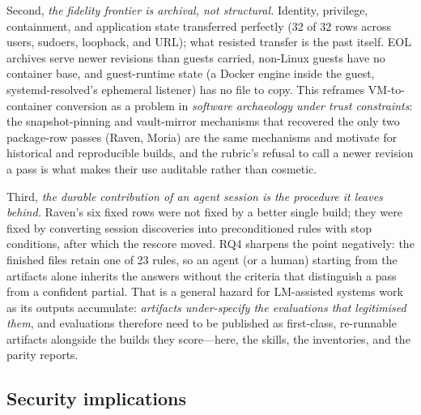 \documentclass[3p,twocolumn,authoryear]{elsarticle}
\begin{document}
Second, \emph{the fidelity frontier is archival, not structural.}
Identity, privilege, containment, and application state transferred
perfectly (32 of 32 rows across users, sudoers, loopback, and URL);
what resisted transfer is the past itself. EOL archives serve newer
revisions than guests carried, non-Linux guests have no container
base, and guest-runtime state (a Docker engine inside the guest,
systemd-resolved's ephemeral listener) has no file to copy. This
reframes VM-to-container conversion as a problem in \emph{software
archaeology under trust constraints}: the snapshot-pinning and
vault-mirror mechanisms that recovered the only two package-row passes
(Raven, Moria) are the same mechanisms \citet{caneill2017} and
\citet{lamb2022} motivate for historical and reproducible builds, and
the rubric's refusal to call a newer revision a pass is what makes
their use auditable rather than cosmetic.

Third, \emph{the durable contribution of an agent session is the
procedure it leaves behind.} Raven's six fixed rows were not fixed by
a better single build; they were fixed by converting session
discoveries into preconditioned rules with stop conditions, after
which the rescore moved. RQ4 sharpens the point negatively: the
finished files retain one of 23 rules, so an agent (or a human)
starting from the artifacts alone inherits the answers without the
criteria that distinguish a pass from a confident partial. That is a
general hazard for LM-assisted systems work as its outputs accumulate:
\emph{artifacts under-specify the evaluations that legitimised them},
and evaluations therefore need to be published as first-class,
re-runnable artifacts alongside the builds they score---here, the
skills, the inventories, and the parity reports.

\subsection{Security implications}
\end{document}
